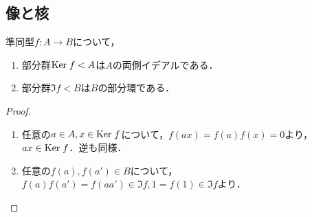 \documentclass[uplatex,dvipdfmx]{jsreport}
\begin{document}
\subsection{像と核}

\begin{proposition}\label{prop-kernel-of-ring-homomorphism}
    準同型$f:A\to B$について，
    \begin{enumerate}
        \item 部分群$\mathrm{Ker}\; f<A$は$A$の両側イデアルである．
        \item 部分群$\Im f<B$は$B$の部分環である．
    \end{enumerate}
\end{proposition}
\begin{proof}\mbox{}
    \begin{enumerate}
        \item 任意の$a\in A,x\in\mathrm{Ker}\; f$について，$f(ax)=f(a)f(x)=0$より，$ax\in\mathrm{Ker}\; f$．逆も同様．
        \item 任意の$f(a),f(a')\in B$について，$f(a)f(a')=f(aa')\in\Im f,1=f(1)\in\Im f$より．
    \end{enumerate}
\end{proof}
\end{document}
